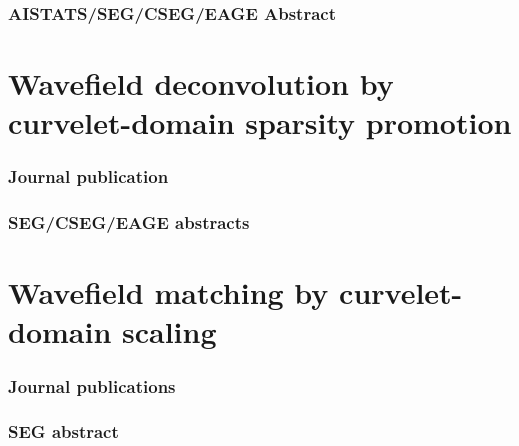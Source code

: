 \documentclass{article}
\begin{document}
\noindent
{} 


\subsubsection*{AISTATS/SEG/CSEG/EAGE Abstract}
\noindent
{}
\noindent
{}
\noindent
{}

\section*{Wavefield deconvolution by curvelet-domain sparsity
  promotion}\label{sec:wavef-deconv-curv}

\subsubsection*{Journal publication}
\label{sec:journal-publication}

\noindent
{} 

\subsubsection*{SEG/CSEG/EAGE abstracts}
\label{sec:segcs-abstr}
\noindent
{} 

\noindent
{} 

\noindent {} 

\noindent {} 

\noindent {} 

\noindent
{} 

\section*{Wavefield matching by curvelet-domain scaling}
\label{sec:matching}
%
\subsubsection*{Journal publications}
\label{sec:journal-publications-5}

\noindent
{} 

\subsubsection*{SEG abstract}
\label{sec:seg-abstract}
\end{document}
